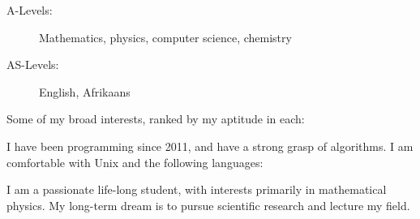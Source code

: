 \documentclass[10pt,a4paper,ragged2e,withhyper]{altacv}
\begin{document}
\begin{paracol}{2}
\divider

\begin{description}
    \item[A-Levels:] Mathematics, physics, computer science, chemistry
    \item[AS-Levels:] English, Afrikaans
\end{description}

Some of my broad interests, ranked by my aptitude in each:\\
\vspace{3mm}
\smallskip
{}
\smallskip
{}
\smallskip
{}

\smallskip
\divider

I have been programming since 2011, and have a strong grasp of algorithms.
I am comfortable with Unix and the following languages:\\
\vspace{3mm}
%
\cvtag{\TeX{}}%


\newpage
\switchcolumn %



I am a passionate life-long student, with interests primarily in mathematical physics.
My long-term dream is to pursue scientific research and lecture my field.


\end{paracol}
\end{document}

